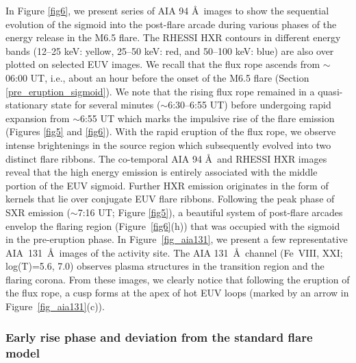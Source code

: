 \documentclass[twocolumn]{aastex6}
\begin{document}
\begin{figure*}
\caption{Representative AIA 131 \AA~images showing the important stages of the eruption. After the eruption of the flux rope (FR), the flaring region is enveloped by a bright loop arcade. Following the eruption, we note a cusp at the northern end of the loop arcade (panel (c)).}
\label{fig_aia131}
\end{figure*}

In Figure \ref{fig6}, we present series of AIA 94 \AA~images to show the sequential evolution of the sigmoid into the post-flare arcade during various phases of the energy release in the M6.5 flare. The RHESSI HXR contours in different energy bands (12--25 keV: yellow, 25--50 keV: red, and 50--100 keV: blue) are also over plotted on selected EUV images. We recall that the flux rope ascends from $\sim$06:00 UT, i.e., about an hour before the onset of the M6.5 flare (Section \ref{pre_eruption_sigmoid}). We note that the rising flux rope remained in a quasi-stationary state for several minutes ($\sim $6:30--6:55 UT) before undergoing rapid expansion from $ \sim $6:55 UT which marks the impulsive rise of the flare emission (Figures \ref{fig5} and \ref{fig6}). With the rapid eruption of the flux rope, we observe intense brightenings in the source region which subsequently evolved into two distinct flare ribbons. The co-temporal AIA 94 \AA~and RHESSI HXR images reveal that the high energy emission is entirely associated with the middle portion of the EUV sigmoid. Further HXR emission originates in the form of kernels that lie over conjugate EUV flare ribbons. Following the peak phase of SXR emission ($ \sim $7:16 UT; Figure \ref{fig5}), a beautiful system of post-flare arcades envelop the flaring region (Figure~\ref{fig6}(h)) that was occupied with the sigmoid in the pre-eruption phase. In Figure~\ref{fig_aia131}, we present a few representative AIA~131~\AA~images of the activity site. 
The AIA 131~\AA~channel (Fe~{\footnotesize VIII, XXI}; log(T)=5.6, 7.0) observes plasma structures in the transition region and the flaring corona. From these images, we clearly notice that following the eruption of the flux rope, a cusp forms at the apex of hot EUV loops (marked by an arrow in Figure~\ref{fig_aia131}(c)). 
 
\subsubsection{Early rise phase and deviation from the standard flare model}
\label{sec_early_rise}
\end{document}
